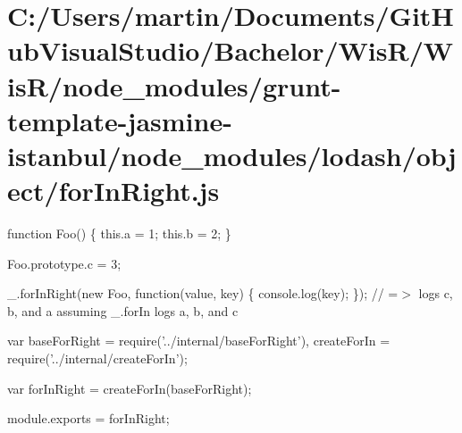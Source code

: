 \hypertarget{_c_1_2_users_2martin_2_documents_2_git_hub_visual_studio_2_bachelor_2_wis_r_2_wis_r_2node_modulee47d63a19f27a7b903518913a4e220d3}{}\section{C\+:/\+Users/martin/\+Documents/\+Git\+Hub\+Visual\+Studio/\+Bachelor/\+Wis\+R/\+Wis\+R/node\+\_\+modules/grunt-\/template-\/jasmine-\/istanbul/node\+\_\+modules/lodash/object/for\+In\+Right.\+js}
function Foo() \{ this.\+a = 1; this.\+b = 2; \}

Foo.\+prototype.\+c = 3;

\+\_\+.\+for\+In\+Right(new Foo, function(value, key) \{ console.\+log(key); \}); // =$>$ logs \textquotesingle{}c\textquotesingle{}, \textquotesingle{}b\textquotesingle{}, and \textquotesingle{}a\textquotesingle{} assuming {\ttfamily \+\_\+.\+for\+In} logs \textquotesingle{}a\textquotesingle{}, \textquotesingle{}b\textquotesingle{}, and \textquotesingle{}c\textquotesingle{}


\begin{DoxyCodeInclude}
var baseForRight = require(\textcolor{stringliteral}{'../internal/baseForRight'}),
    createForIn = require(\textcolor{stringliteral}{'../internal/createForIn'});

var forInRight = createForIn(baseForRight);

module.exports = forInRight;
\end{DoxyCodeInclude}
 